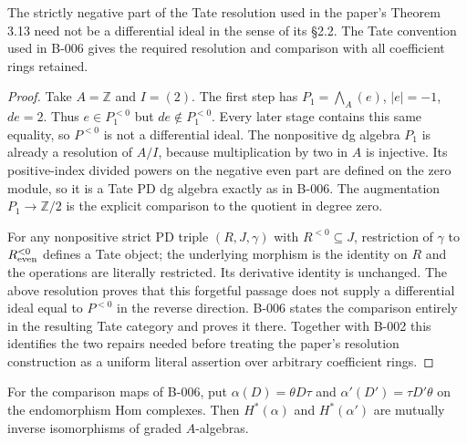 \begin{proposition}
\label{B007}
The strictly negative part of the Tate resolution used in the paper's
Theorem 3.13 need not be a differential ideal in the sense of its
\S2.2.  The Tate convention used in B-006 gives the required
resolution and comparison with all coefficient rings retained.
\end{proposition}

\begin{proof}
Take $A=\mathbb Z$ and $I=(2)$.  The first step has
$P_1=\bigwedge_A(e)$, $|e|=-1$, $de=2$.
Thus $e\in P_1^{<0}$ but $de\notin P_1^{<0}$.
Every later stage contains this same equality, so $P^{<0}$ is not a
differential ideal.  The nonpositive dg algebra $P_1$ is already a
resolution of $A/I$, because multiplication by two in $A$ is injective.
Its positive-index divided powers on the negative even part are defined
on the zero module, so it is a Tate PD dg algebra exactly as in B-006.
The augmentation $P_1\to\mathbb Z/2$ is the explicit comparison to
the quotient in degree zero.

For any nonpositive strict PD triple $(R,J,\gamma)$ with $R^{<0}\subseteq J$,
restriction of $\gamma$ to $R^{<0}_{\rm even}$ defines a Tate object;
the underlying morphism is the identity on $R$ and the operations are
literally restricted.  Its derivative identity is unchanged.  The above
resolution proves that this forgetful passage does not supply a
differential ideal equal to $P^{<0}$ in the reverse direction.
B-006 states the comparison entirely in the resulting Tate category
and proves it there.  Together with B-002 this identifies the two
repairs needed before treating the paper's resolution construction as
a uniform literal assertion over arbitrary coefficient rings.
\end{proof}

\begin{proposition}
\label{B008}
For the comparison maps of B-006, put
$\alpha(D)=\theta D\tau$ and $\alpha'(D')=\tau D'\theta$ on the
endomorphism Hom complexes.  Then $H^*(\alpha)$ and $H^*(\alpha')$
are mutually inverse isomorphisms of graded $A$-algebras.
\end{proposition}


